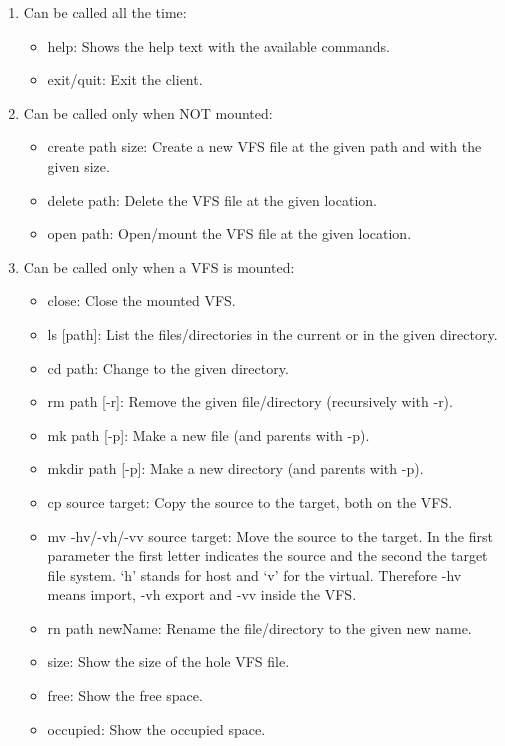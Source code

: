 \documentclass[11pt]{article}
\begin{document}
\begin{enumerate}
	\item Can be called all the time:
	\begin{itemize}
		\item help: Shows the help text with the available commands.
		\item exit/quit: Exit the client.
	\end{itemize}
	\item Can be called only when NOT mounted:
	\begin{itemize}
		\item create path size: Create a new VFS file at the given path and with the given size.
		\item delete path: Delete the VFS file at the given location.
		\item open path: Open/mount the VFS file at the given location.
	\end{itemize}
	\item Can be called only when a VFS is mounted:
	\begin{itemize}
		\item close: Close the mounted VFS.
		\item ls [path]: List the files/directories in the current or in the given directory.
		\item cd path: Change to the given directory.
		\item rm path [-r]: Remove the given file/directory (recursively with -r).
		\item mk path [-p]: Make a new file (and parents with -p).
		\item mkdir path [-p]: Make a new directory (and parents with -p).
		\item cp source target: Copy the source to the target, both on the VFS.
		\item 	mv -hv/-vh/-vv source target: Move the source to the target. In the first parameter the first letter indicates the source and the second the target file system.  ‘h’ stands for host and ‘v’ for the virtual. Therefore -hv means import, -vh export and -vv inside the VFS.
		\item rn path newName: Rename the file/directory to the given new name.
		\item size: Show the size of the hole VFS file.
		\item free: Show the free space.
		\item occupied: Show the occupied space.
	\end{itemize}
\end{enumerate}


\begin{thebibliography}{99}

\end{thebibliography}
\end{document}
